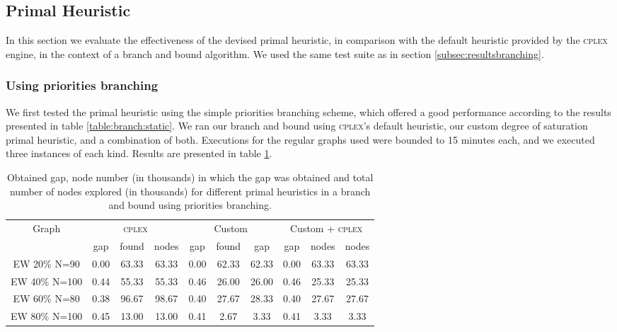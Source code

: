 
\subsection{Primal Heuristic}
\label{subsec:resultsprimal}

In this section we evaluate the effectiveness of the devised primal heuristic, in comparison with the default heuristic provided by the \textsc{cplex} engine, in the context of a branch and bound algorithm. We used the same test suite as in section \ref{subsec:resultsbranching}.

\subsubsection{Using priorities branching}

We first tested the primal heuristic using the simple priorities branching scheme, which offered a good performance according to the results presented in table \ref{table:branch:static}. We ran our branch and bound using \textsc{cplex}'s default heuristic, our custom degree of saturation primal heuristic, and a combination of both. Executions for the regular graphs used were bounded to 15 minutes each, and we executed three instances of each kind. Results are presented in table \ref{table:primal:prios}.

\begin{table}[h]
\label{table:primal:prios}
\centering

\begin{tabular}{|c|ccc|ccc|ccc|}
\hline
\multicolumn{1}{|c|}{Graph} & \multicolumn{3}{|c|}{\textsc{cplex}} & \multicolumn{3}{|c|}{Custom} & \multicolumn{3}{|c|}{Custom + \textsc{cplex}}
\\
 & gap & found & nodes & gap & found & gap & gap & nodes & nodes
\\
\hline
EW 20\% N=90 & 0.00 & 63.33 & 63.33 & 0.00 & 62.33 & 62.33 & 0.00 & 63.33 & 63.33
\\
EW 40\% N=100 & 0.44 & 55.33 & 55.33 & 0.46 & 26.00 & 26.00 & 0.46 & 25.33 & 25.33
\\
EW 60\% N=80 & 0.38 & 96.67 & 98.67 & 0.40 & 27.67 & 28.33 & 0.40 & 27.67 & 27.67
\\
EW 80\% N=100 & 0.45 & 13.00 & 13.00 & 0.41 & 2.67 & 3.33 & 0.41 & 3.33 & 3.33
\\
\hline 
 \end{tabular}

\caption{Obtained gap, node number (in thousands) in which the gap was obtained and total number of nodes explored (in thousands) for different primal heuristics in a branch and bound using priorities branching.}

\end{table}

